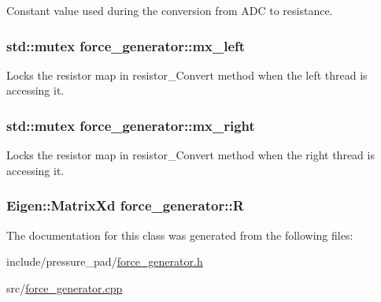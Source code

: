Constant value used during the conversion from A\-D\-C to resistance. 

\hypertarget{classforce__generator_ab86abf71ba8319645ab92accd1f80a99}{
\subsubsection[{mx\-\_\-left}]{\setlength{\rightskip}{0pt plus 5cm}std\-::mutex force\-\_\-generator\-::mx\-\_\-left\hspace{0.3cm}{\ttfamily [private]}}}\label{classforce__generator_ab86abf71ba8319645ab92accd1f80a99}


Locks the resistor map in resistor\-\_\-\-Convert method when the left thread is accessing it. 

\hypertarget{classforce__generator_a3f70de55db80a2e7ec683cf9605e2015}{
\subsubsection[{mx\-\_\-right}]{\setlength{\rightskip}{0pt plus 5cm}std\-::mutex force\-\_\-generator\-::mx\-\_\-right\hspace{0.3cm}{\ttfamily [private]}}}\label{classforce__generator_a3f70de55db80a2e7ec683cf9605e2015}


Locks the resistor map in resistor\-\_\-\-Convert method when the right thread is accessing it. 

\hypertarget{classforce__generator_a6e529fccfe5e577bcd0dc3e017ece70c}{
\subsubsection[{R}]{\setlength{\rightskip}{0pt plus 5cm}Eigen\-::\-Matrix\-Xd force\-\_\-generator\-::\-R\hspace{0.3cm}{\ttfamily [private]}}}\label{classforce__generator_a6e529fccfe5e577bcd0dc3e017ece70c}


The documentation for this class was generated from the following files\-:\begin{DoxyCompactItemize}
\item 
include/pressure\-\_\-pad/\hyperlink{force__generator_8h}{force\-\_\-generator.\-h}\item 
src/\hyperlink{force__generator_8cpp}{force\-\_\-generator.\-cpp}\end{DoxyCompactItemize}
